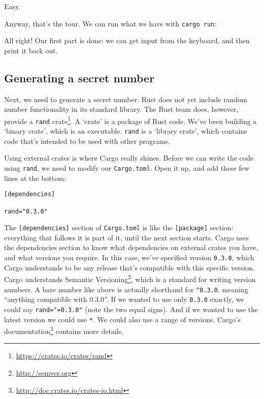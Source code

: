 \documentclass[a4paper,]{book}
\newenvironment{Shaded}{\begin{snugshade}}{\end{snugshade}}
\newcommand{\KeywordTok}[1]{\textcolor[rgb]{0.13,0.29,0.53}{\textbf{{#1}}}}
\newcommand{\NormalTok}[1]{{#1}}
\renewcommand{\href}[2]{#2\footnote{\url{#1}}}
\begin{document}
Easy.

Anyway, that's the tour. We can run what we have with
\texttt{cargo\ run}:

\begin{Shaded}
\end{Shaded}

All right! Our first part is done: we can get input from the keyboard,
and then print it back out.

\subsection{Generating a secret
number}\label{generating-a-secret-number}

Next, we need to generate a secret number. Rust does not yet include
random number functionality in its standard library. The Rust team does,
however, provide a \href{https://crates.io/crates/rand}{\texttt{rand}
crate}. A `crate' is a package of Rust code. We've been building a
`binary crate', which is an executable. \texttt{rand} is a `library
crate', which contains code that's intended to be used with other
programs.

Using external crates is where Cargo really shines. Before we can write
the code using \texttt{rand}, we need to modify our \texttt{Cargo.toml}.
Open it up, and add these few lines at the bottom:

\begin{verbatim}
[dependencies]

rand="0.3.0"
\end{verbatim}

The \texttt{{[}dependencies{]}} section of \texttt{Cargo.toml} is like
the \texttt{{[}package{]}} section: everything that follows it is part
of it, until the next section starts. Cargo uses the dependencies
section to know what dependencies on external crates you have, and what
versions you require. In this case, we've specified version
\texttt{0.3.0}, which Cargo understands to be any release that's
compatible with this specific version. Cargo understands
\href{http://semver.org}{Semantic Versioning}, which is a standard for
writing version numbers. A bare number like above is actually shorthand
for \texttt{\^{}0.3.0}, meaning ``anything compatible with 0.3.0''. If
we wanted to use only \texttt{0.3.0} exactly, we could say
\texttt{rand="=0.3.0"} (note the two equal signs). And if we wanted to
use the latest version we could use \texttt{*}. We could also use a
range of versions. \href{http://doc.crates.io/crates-io.html}{Cargo's
documentation} contains more details.
\end{document}
